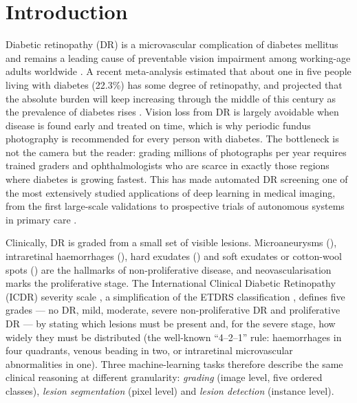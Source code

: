 \section{Introduction}
\label{sec:intro}

Diabetic retinopathy (DR) is a microvascular complication of diabetes mellitus and remains a leading cause of preventable vision impairment among working-age adults worldwide \citep{teo2021,saeedi2019}. A recent meta-analysis estimated that about one in five people living with diabetes (22.3\%) has some degree of retinopathy, and projected that the absolute burden will keep increasing through the middle of this century as the prevalence of diabetes rises \citep{teo2021}. Vision loss from DR is largely avoidable when disease is found early and treated on time, which is why periodic fundus photography is recommended for every person with diabetes. The bottleneck is not the camera but the reader: grading millions of photographs per year requires trained graders and ophthalmologists who are scarce in exactly those regions where diabetes is growing fastest. This has made automated DR screening one of the most extensively studied applications of deep learning in medical imaging, from the first large-scale validations \citep{gulshan2016,ting2017} to prospective trials of autonomous systems in primary care \citep{abramoff2018}.

Clinically, DR is graded from a small set of visible lesions. Microaneurysms (\ma), intraretinal haemorrhages (\he), hard exudates (\ex) and soft exudates or cotton-wool spots (\se) are the hallmarks of non-proliferative disease, and neovascularisation marks the proliferative stage. The International Clinical Diabetic Retinopathy (ICDR) severity scale \citep{wilkinson2003}, a simplification of the ETDRS classification \citep{etdrs1991}, defines five grades --- no DR, mild, moderate, severe non-proliferative DR and proliferative DR --- by stating which lesions must be present and, for the severe stage, how widely they must be distributed (the well-known ``4--2--1'' rule: haemorrhages in four quadrants, venous beading in two, or intraretinal microvascular abnormalities in one). Three machine-learning tasks therefore describe the same clinical reasoning at different granularity: \emph{grading} (image level, five ordered classes), \emph{lesion segmentation} (pixel level) and \emph{lesion detection} (instance level).

